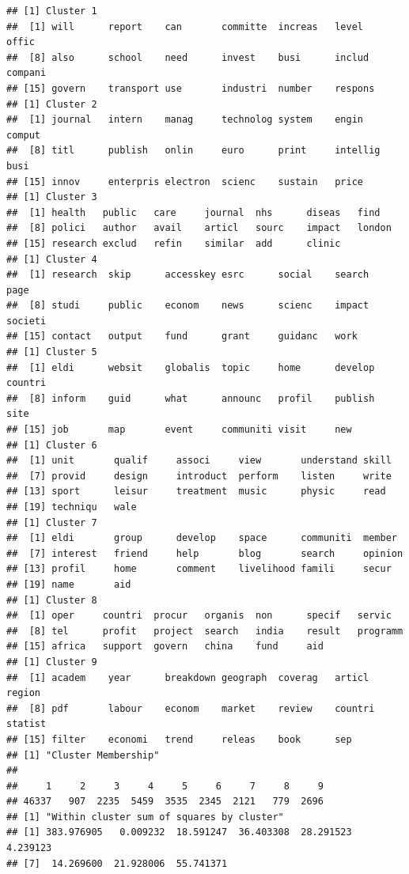 \documentclass[11pt,article,oneside]{memoir}
\begin{document}
\begin{verbatim}
## [1] Cluster 1      
##  [1] will      report    can       committe  increas   level     offic    
##  [8] also      school    need      invest    busi      includ    compani  
## [15] govern    transport use       industri  number    respons  
## [1] Cluster 2      
##  [1] journal   intern    manag     technolog system    engin     comput   
##  [8] titl      publish   onlin     euro      print     intellig  busi     
## [15] innov     enterpris electron  scienc    sustain   price    
## [1] Cluster 3      
##  [1] health   public   care     journal  nhs      diseas   find    
##  [8] polici   author   avail    articl   sourc    impact   london  
## [15] research exclud   refin    similar  add      clinic  
## [1] Cluster 4      
##  [1] research  skip      accesskey esrc      social    search    page     
##  [8] studi     public    econom    news      scienc    impact    societi  
## [15] contact   output    fund      grant     guidanc   work     
## [1] Cluster 5      
##  [1] eldi      websit    globalis  topic     home      develop   countri  
##  [8] inform    guid      what      announc   profil    publish   site     
## [15] job       map       event     communiti visit     new      
## [1] Cluster 6      
##  [1] unit       qualif     associ     view       understand skill     
##  [7] provid     design     introduct  perform    listen     write     
## [13] sport      leisur     treatment  music      physic     read      
## [19] techniqu   wale      
## [1] Cluster 7      
##  [1] eldi       group      develop    space      communiti  member    
##  [7] interest   friend     help       blog       search     opinion   
## [13] profil     home       comment    livelihood famili     secur     
## [19] name       aid       
## [1] Cluster 8      
##  [1] oper     countri  procur   organis  non      specif   servic  
##  [8] tel      profit   project  search   india    result   programm
## [15] africa   support  govern   china    fund     aid     
## [1] Cluster 9      
##  [1] academ    year      breakdown geograph  coverag   articl    region   
##  [8] pdf       labour    econom    market    review    countri   statist  
## [15] filter    economi   trend     releas    book      sep      
## [1] "Cluster Membership"
## 
##     1     2     3     4     5     6     7     8     9 
## 46337   907  2235  5459  3535  2345  2121   779  2696 
## [1] "Within cluster sum of squares by cluster"
## [1] 383.976905   0.009232  18.591247  36.403308  28.291523   4.239123
## [7]  14.269600  21.928006  55.741371
\end{verbatim}
\end{document}
